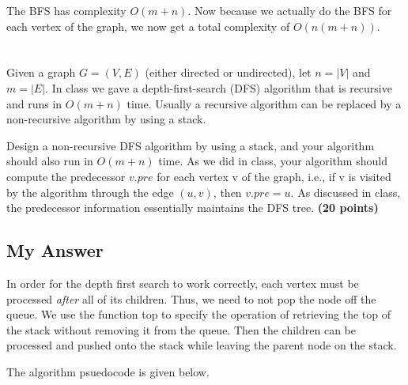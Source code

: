 \documentclass{article}
\begin{document}
The BFS has complexity $O(m+n)$.  Now because we actually do the BFS
for each vertex of the graph, we now get a total complexity of
$O(n(m+n))$. 




\section{}%
Given a graph $G = (V, E)$ (either directed or undirected), let $n = 
|V|$ and $m = |E|$. In class we gave a depth-first-search (DFS)
algorithm that is recursive and runs in $O(m + n)$ time.  Usually a
recursive algorithm can be replaced by a non-recursive algorithm by
using a stack. 

Design a non-recursive DFS algorithm by using a stack, and your
algorithm should also run in $O(m + n)$ time. As we did in class, your  
algorithm should compute the predecessor $v.pre$ for each vertex v of
the graph, i.e., if v is visited by the algorithm through the edge
$(u, v)$, then $v.pre = u$. As discussed in class, the predecessor
information essentially maintains the DFS tree. {\bf (20 points) }

\subsection{My Answer}
In order for the depth first search to work correctly, each vertex
must be processed \emph{after} all of its children.  Thus, we need to
not pop the node off the queue.  We use the function {\sc top} to
specify the operation of retrieving the top of the stack without
removing it from the queue.  Then the children can be processed and
pushed onto the stack while leaving the parent node on the stack.

The algorithm psuedocode is given below.
\end{document}
